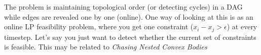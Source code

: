 \documentclass[11pt]{article}
\begin{document}
The problem is maintaining topological order (or detecting cycles) in a DAG while edges are revealed one by one (online).
One way of looking at this is as an online LP feasibility problem, where you get one constraint ($x_i - x_j > \epsilon$) at every timestep.
Let's say you just want to detect whether the current set of constraints is feasible.
This may be related to \emph{Chasing Nested Convex Bodies} \cite{nested}



\end{document}
